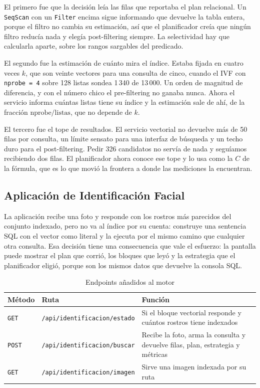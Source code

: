 \documentclass[a4paper,12pt]{article}
\begin{document}
El primero fue que la decisión leía las filas que reportaba el plan relacional.
Un \texttt{SeqScan} con un \texttt{Filter} encima sigue informando que devuelve
la tabla entera, porque el filtro no cambia su estimación, así que el
planificador creía que ningún filtro reducía nada y elegía post-filtering
siempre. La selectividad hay que calcularla aparte, sobre los rangos sargables
del predicado.

El segundo fue la estimación de cuánto mira el índice. Estaba fijada en cuatro
veces $k$, que son veinte vectores para una consulta de cinco, cuando el IVF con
\texttt{nprobe = 4} sobre 128 listas sondea 1\,340 de 13\,000. Un orden de
magnitud de diferencia, y con el número chico el pre-filtering no ganaba nunca.
Ahora el servicio informa cuántas listas tiene su índice y la estimación sale de
ahí, de la fracción $\text{nprobe}/\text{listas}$, que no depende de $k$.

El tercero fue el tope de resultados. El servicio vectorial no devuelve más de
50 filas por consulta, un límite sensato para una interfaz de búsqueda y un techo
duro para el post-filtering. Pedir 326 candidatos no servía de nada y seguíamos
recibiendo dos filas. El planificador ahora conoce ese tope y lo usa como la $C$
de la fórmula, que es lo que movió la frontera a donde las mediciones la
encuentran.

\subsection{Aplicación de Identificación Facial}

La aplicación recibe una foto y responde con los rostros más parecidos del
conjunto indexado, pero no va al índice por su cuenta: construye una sentencia
SQL con el vector como literal y la ejecuta por el mismo camino que cualquier
otra consulta. Esa decisión tiene una consecuencia que vale el esfuerzo: la
pantalla puede mostrar el plan que corrió, los bloques que leyó y la estrategia
que el planificador eligió, porque son los mismos datos que devuelve la consola
SQL.

\begin{table}[H]
\centering
\caption{Endpoints añadidos al motor}
\begin{tabularx}{\textwidth}{@{}llX@{}}
\toprule
\textbf{Método} & \textbf{Ruta} & \textbf{Función} \\
\midrule
\texttt{GET} & \texttt{/api/identificacion/estado} & Si el bloque vectorial
responde y cuántos rostros tiene indexados \\
\texttt{POST} & \texttt{/api/identificacion/buscar} & Recibe la foto, arma la
consulta y devuelve filas, plan, estrategia y métricas \\
\texttt{GET} & \texttt{/api/identificacion/imagen} & Sirve una imagen indexada
por su ruta \\
\bottomrule
\end{tabularx}
\end{table}
\end{document}
